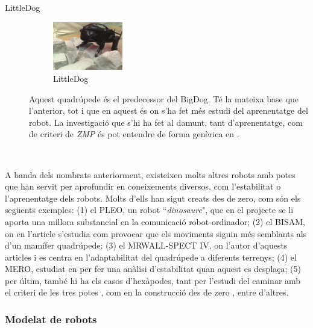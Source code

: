 \documentclass[12pt,a4paper,final,twoside]{article}
\begin{document}
\begin{description}
\item[LittleDog]
\begin{minipage}[t]{0.94\linewidth}
	\begin{figure}
	    \centering
		\includegraphics[width=0.30\textwidth]{Imatges/LittleDog}
                \caption{LittleDog \cite{Kalakrishnan2010}}
     \end{figure}
 Aquest quadrúpede és el predecessor del BigDog. Té la mateixa base que l'anterior, tot i que en aquest és on s'ha fet més estudi del aprenentatge del robot. La investigació que s'hi ha fet al damunt, tant d'aprenentatge, com de criteri de \textit{ZMP} és pot entendre de forma genèrica en \cite{Kalakrishnan2010}. 
\end{minipage}\\

\end{description}


A banda dels nombrats anteriorment, existeixen molts altres robots amb potes que han servit per aprofundir en coneixements diversos, com l'estabilitat o l'aprenentatge dels robots. Molts d'ells han sigut creats des de zero, com són els següents exemples: (1) el PLEO, un robot ``\textit{dinosaure}", que en el projecte \cite{Menendez2011} se li aporta una millora substancial en la comunicació robot-ordinador; (2) el BISAM, on en l'article \cite{Albiez2003} s'estudia com provocar que els moviments siguin més semblants als d'un mamífer quadrúpede; (3) el MRWALL-SPECT IV, on l'autor d'aquests articles \cite{Loc2010} i \cite{Loc2011} es centra en l'adaptabilitat del quadrúpede a diferents terrenys; (4) el MERO, estudiat en \cite{Ion} per fer una anàlisi d'estabilitat quan aquest es desplaça; (5) per últim, també hi ha els casos d'hexàpodes, tant per l'estudi del caminar amb el criteri de les tres potes \cite{Lee1988}, com en la construcció des de zero \cite{Lojo2009}, entre d'altres. 


\subsubsection{Modelat de robots}
\label{Modelat de robots}
\end{document}
